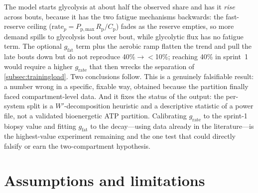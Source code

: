 \documentclass[11pt,a4paper]{article}
\newcommand{\Wp}{\ensuremath{W'}}
\newcommand{\Rp}{\ensuremath{R_{\mathrm p}}}
\newcommand{\Cp}{\ensuremath{C_{\mathrm p}}}
\newcommand{\Ppmax}{\ensuremath{P_{\mathrm{p,max}}}}
\newcommand{\grate}{\ensuremath{g_{\mathrm{rate}}}}
\begin{document}
The model starts glycolysis at about half the observed share and has it \emph{rise} across bouts, because
it has the two fatigue mechanisms backwards: the fast-reserve ceiling ($\mathrm{rate}_p = \Ppmax\,\Rp/\Cp$)
fades as the reserve empties, so more demand spills to glycolysis bout over bout, while glycolytic flux has
no fatigue term. The optional $g_{\mathrm{fat}}$ term plus the aerobic ramp flatten the trend and pull the
late bouts down but do not reproduce 40\%$\rightarrow$$<$10\%; reaching 40\% in sprint~1 would require a
higher \grate{} that then wrecks the separation of \cref{subsec:trainingload}. Two conclusions follow. This
is a genuinely falsifiable result: a number wrong in a specific, fixable way, obtained because the
partition finally faced compartment-level data. And it fixes the status of the output: the per-system split
is a \Wp-decomposition heuristic and a descriptive statistic of a power file, not a validated bioenergetic
ATP partition. Calibrating \grate{} to the sprint-1 biopsy value and fitting $g_{\mathrm{fat}}$ to the
decay---using data already in the literature---is the highest-value experiment remaining and the one test
that could directly falsify or earn the two-compartment hypothesis.

\section{Assumptions and limitations}\label{sec:assumptions}
\end{document}
